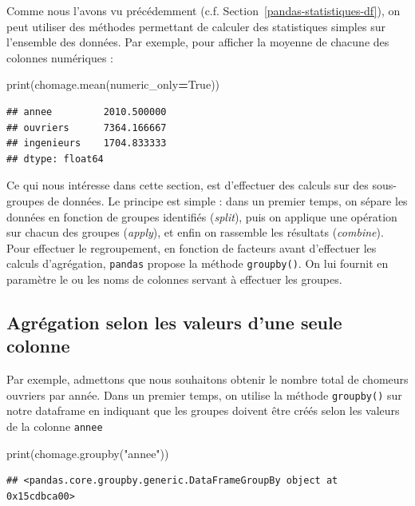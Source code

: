 \documentclass[
  12pt,
]{book}
\newenvironment{Shaded}{\begin{snugshade}}{\end{snugshade}}
\newcommand{\BuiltInTok}[1]{#1}
\newcommand{\NormalTok}[1]{#1}
\newcommand{\OperatorTok}[1]{\textcolor[rgb]{0.81,0.36,0.00}{\textbf{#1}}}
\newcommand{\StringTok}[1]{\textcolor[rgb]{0.31,0.60,0.02}{#1}}
\newcommand{\VariableTok}[1]{\textcolor[rgb]{0.00,0.00,0.00}{#1}}
\numberwithin{equation}{section}
\numberwithin{countremarque}{section}
\begin{document}
Comme nous l'avons vu précédemment (c.f. Section~\ref{pandas-statistiques-df}), on peut utiliser des méthodes permettant de calculer des statistiques simples sur l'ensemble des données. Par exemple, pour afficher la moyenne de chacune des colonnes numériques :

\begin{Shaded}
\begin{Highlighting}[]
\BuiltInTok{print}\NormalTok{(chomage.mean(numeric\_only}\OperatorTok{=}\VariableTok{True}\NormalTok{))}
\end{Highlighting}
\end{Shaded}

\begin{lstlisting}
## annee         2010.500000
## ouvriers      7364.166667
## ingenieurs    1704.833333
## dtype: float64
\end{lstlisting}

Ce qui nous intéresse dans cette section, est d'effectuer des calculs sur des sous-groupes de données. Le principe est simple : dans un premier temps, on sépare les données en fonction de groupes identifiés (\emph{split}), puis on applique une opération sur chacun des groupes (\emph{apply}), et enfin on rassemble les résultats (\emph{combine}). Pour effectuer le regroupement, en fonction de facteurs avant d'effectuer les calculs d'agrégation, \texttt{pandas} propose la méthode \texttt{groupby()}. On lui fournit en paramètre le ou les noms de colonnes servant à effectuer les groupes.

\subsection{Agrégation selon les valeurs d'une seule colonne}\label{agruxe9gation-selon-les-valeurs-dune-seule-colonne}

Par exemple, admettons que nous souhaitons obtenir le nombre total de chomeurs ouvriers par année. Dans un premier temps, on utilise la méthode \texttt{groupby()} sur notre dataframe en indiquant que les groupes doivent être créés selon les valeurs de la colonne \texttt{annee}

\begin{Shaded}
\begin{Highlighting}[]
\BuiltInTok{print}\NormalTok{(chomage.groupby(}\StringTok{"annee"}\NormalTok{))}
\end{Highlighting}
\end{Shaded}

\begin{lstlisting}
## <pandas.core.groupby.generic.DataFrameGroupBy object at 0x15cdbca00>
\end{lstlisting}
\end{document}
